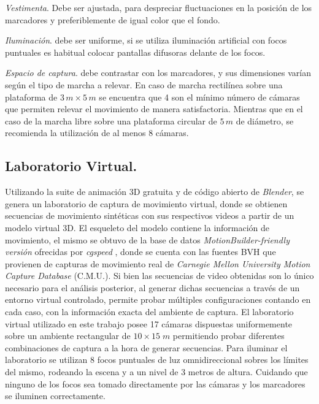 \textit{Vestimenta}. Debe ser ajustada, para despreciar fluctuaciones en la posición de los marcadores y preferiblemente de igual color que el fondo. 


\textit{Iluminación}. debe ser uniforme, si se utiliza iluminación artificial con focos puntuales es habitual colocar pantallas difusoras delante de los focos.


\textit{Espacio de captura}. debe contrastar con los marcadores, y sus dimensiones varían según el tipo de marcha a relevar. En caso de marcha rectilínea sobre una plataforma de $3\,m \times 5 \,m$ se encuentra que 4 son el mínimo número de cámaras que permiten relevar el movimiento de manera satisfactoria. Mientras  que en el caso de la marcha libre sobre una plataforma circular de $5\,m$ de diámetro, se recomienda la utilización de al menos 8 cámaras.

\vspace{-0.3cm} 
\subsection{Laboratorio Virtual.} Utilizando la suite de animación 3D gratuita y de código abierto de \textit{Blender}, se genera un laboratorio de captura de movimiento virtual, donde se obtienen secuencias de movimiento sintéticas con sus respectivos videos a partir de un modelo virtual 3D. El esqueleto del modelo contiene la información de movimiento, el mismo se obtuvo de la base de datos \textit{MotionBuilder-friendly versión} ofrecidas por \textit{cgspeed} \cite{cgspeed}, 
donde se cuenta con las fuentes BVH que provienen de capturas de movimiento real de \textit{Carnegie Mellon University Motion Capture Database} (C.M.U.). Si bien las secuencias de video obtenidas son lo único necesario para el análisis posterior, al generar dichas secuencias a través de un entorno virtual controlado, permite probar múltiples configuraciones contando en cada caso, con la información exacta del ambiente de captura. El laboratorio virtual utilizado en este trabajo posee 17 cámaras dispuestas uniformemente sobre un ambiente rectangular de $10\times15\;m $ permitiendo probar diferentes combinaciones de captura a la hora de generar secuencias. 
Para iluminar el laboratorio se utilizan $8$ focos puntuales de luz omnidireccional sobres los límites del mismo, rodeando la escena y a un nivel de 3 metros de altura. Cuidando que ninguno de los focos sea tomado directamente por las cámaras y los marcadores se iluminen correctamente.

